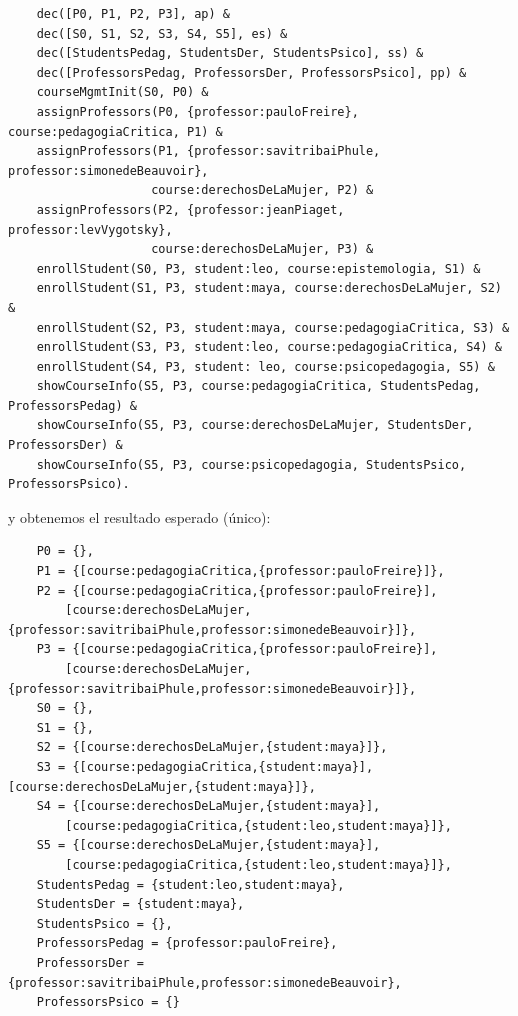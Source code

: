 \documentclass{article}
\begin{document}
\begin{verbatim}
    dec([P0, P1, P2, P3], ap) & 
    dec([S0, S1, S2, S3, S4, S5], es) & 
    dec([StudentsPedag, StudentsDer, StudentsPsico], ss) & 
    dec([ProfessorsPedag, ProfessorsDer, ProfessorsPsico], pp) & 
    courseMgmtInit(S0, P0) & 
    assignProfessors(P0, {professor:pauloFreire}, course:pedagogiaCritica, P1) & 
    assignProfessors(P1, {professor:savitribaiPhule, professor:simonedeBeauvoir},
                    course:derechosDeLaMujer, P2) & 
    assignProfessors(P2, {professor:jeanPiaget, professor:levVygotsky}, 
                    course:derechosDeLaMujer, P3) & 
    enrollStudent(S0, P3, student:leo, course:epistemologia, S1) & 
    enrollStudent(S1, P3, student:maya, course:derechosDeLaMujer, S2) & 
    enrollStudent(S2, P3, student:maya, course:pedagogiaCritica, S3) & 
    enrollStudent(S3, P3, student:leo, course:pedagogiaCritica, S4) & 
    enrollStudent(S4, P3, student: leo, course:psicopedagogia, S5) & 
    showCourseInfo(S5, P3, course:pedagogiaCritica, StudentsPedag, ProfessorsPedag) & 
    showCourseInfo(S5, P3, course:derechosDeLaMujer, StudentsDer, ProfessorsDer) & 
    showCourseInfo(S5, P3, course:psicopedagogia, StudentsPsico, ProfessorsPsico).
\end{verbatim}

y obtenemos el resultado esperado (único):

\begin{verbatim}
    P0 = {},  
    P1 = {[course:pedagogiaCritica,{professor:pauloFreire}]},  
    P2 = {[course:pedagogiaCritica,{professor:pauloFreire}],
        [course:derechosDeLaMujer,{professor:savitribaiPhule,professor:simonedeBeauvoir}]},  
    P3 = {[course:pedagogiaCritica,{professor:pauloFreire}],
        [course:derechosDeLaMujer,{professor:savitribaiPhule,professor:simonedeBeauvoir}]},  
    S0 = {},  
    S1 = {},  
    S2 = {[course:derechosDeLaMujer,{student:maya}]},  
    S3 = {[course:pedagogiaCritica,{student:maya}],[course:derechosDeLaMujer,{student:maya}]},  
    S4 = {[course:derechosDeLaMujer,{student:maya}],
        [course:pedagogiaCritica,{student:leo,student:maya}]},  
    S5 = {[course:derechosDeLaMujer,{student:maya}],
        [course:pedagogiaCritica,{student:leo,student:maya}]},  
    StudentsPedag = {student:leo,student:maya},  
    StudentsDer = {student:maya},  
    StudentsPsico = {},  
    ProfessorsPedag = {professor:pauloFreire},  
    ProfessorsDer = {professor:savitribaiPhule,professor:simonedeBeauvoir},  
    ProfessorsPsico = {}

\end{verbatim}
\end{document}

